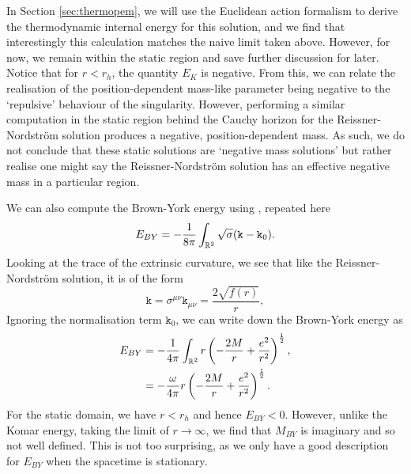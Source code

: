 In Section \ref{sec:thermopem}, we will use the Euclidean action formalism to derive the thermodynamic internal energy for this solution, and we find that interestingly this calculation matches the naive limit taken above. However, for now, we remain within the static region and save further discussion for later. Notice that for $r < r_h$, the quantity $E_K$ is negative. From this, we can relate the realisation of the position-dependent mass-like parameter being negative to the `repulsive' behaviour of the singularity. However, performing a similar computation in the static region behind the Cauchy horizon for the Reissner-Nordstr\"om solution produces a negative, position-dependent mass. As such, we do not conclude that these static solutions are `negative mass solutions' but rather realise one might say the Reissner-Nordstr\"om solution has an effective negative mass in a particular region.  

We can also compute the Brown-York energy using , repeated here
\begin{equation*}
E_{BY} = -\frac{1}{8 \pi} \int_{{\mathbb{R}}^2} \sqrt{\sigma} (\mathtt{k} - \mathtt{k}_0).
\end{equation*}
Looking at the trace of the extrinsic curvature, we see that like the Reissner-Nordstr\"om solution, it is of the form
\begin{equation*}
	\mathtt{k} = \sigma^{\mu \nu} \mathtt{k}_{\mu \nu} = \frac{2 \sqrt{f(r)}}{r},
\end{equation*}
Ignoring the normalisation term $\mathtt{k}_0$, we can write down the Brown-York energy as
\begin{equation*}
\begin{aligned}
	E_{BY} &= -\frac{1}{4 \pi} \int_{{\mathbb{R}}^2} r \left(-\frac{2M}{r} + \frac{e^2}{r^2} \right)^{\frac{1}{2}}, \\
	 &= -\frac{\omega}{4 \pi} r \left(-\frac{2M}{r} + \frac{e^2}{r^2} \right)^{\frac{1}{2}}.
\end{aligned}
\end{equation*}
For the static domain, we have $r < r_h$ and hence $E_{BY} < 0$. However, unlike the Komar energy, taking the limit of $r \to \infty$, we find that $M_{BY}$ is imaginary and so not well defined. This is not too surprising, as we only have a good description for $E_{BY}$ when the spacetime is stationary.

